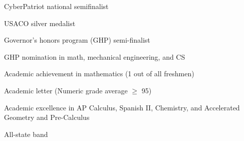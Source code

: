 \documentclass[inter=true, sidebar-width=2.25in, primary=slate]{clean-resume}
\begin{document}
\begin{main}
    
    \begin{lst}
      \item CyberPatriot national semifinalist
      \item USACO silver medalist
      \item Governor's honors program (GHP) semi-finalist
      \item GHP nomination in math, mechanical engineering, and CS
      \item Academic achievement in mathematics (1 out of all freshmen)
      \item Academic letter (Numeric grade average $\ge$ 95)
      \item Academic excellence in AP Calculus, Spanish II, Chemistry, and   Accelerated Geometry and Pre-Calculus
      \item All-state band
    \end{lst}
  \end{main}
\end{document}
